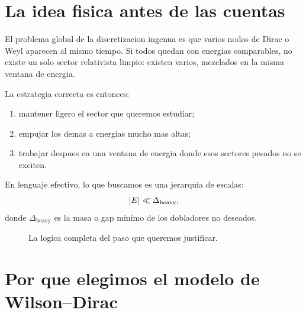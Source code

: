 \section{La idea fisica antes de las cuentas}
El problema global de la discretizacion ingenua es que varios nodos de Dirac o Weyl aparecen al mismo tiempo. Si todos quedan con energias comparables, no existe un solo sector relativista limpio: existen varios, mezclados en la misma ventana de energia.

La estrategia correcta es entonces:
\begin{enumerate}[label=\arabic*.]
    \item mantener ligero el sector que queremos estudiar;
    \item empujar los demas a energias mucho mas altas;
    \item trabajar despues en una ventana de energia donde esos sectores pesados no se exciten.
\end{enumerate}

En lenguaje efectivo, lo que buscamos es una jerarquia de escalas:
\begin{equation}
\abs{E} \ll \Delta_{\text{heavy}},
\end{equation}
donde \(\Delta_{\text{heavy}}\) es la masa o gap minimo de los dobladores no deseados.

\begin{figure}[h!]
\centering
{}
\caption{La logica completa del paso que queremos justificar.}
\end{figure}

\section{Por que elegimos el modelo de Wilson--Dirac}
